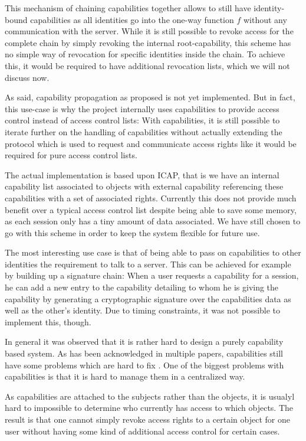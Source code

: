 This mechanism of chaining capabilities together allows to still have identity-bound capabilities as all identities go into the one-way function $f$ without any communication with the server.
While it is still possible to revoke access for the complete chain by simply revoking the internal root-capability, this scheme has no simple way of revocation for specific identities inside the chain.
To achieve this, it would be required to have additional revocation lists, which we will not discuss now.

As said, capability propagation as proposed is not yet implemented.
But in fact, this use-case is why the project internally uses capabilities to provide access control instead of access control lists:
With capabilities, it is still possible to iterate further on the handling of capabilities without actually extending the protocol which is used to request and communicate access rights like it would be required for pure access control lists.

\bigskip

The actual implementation is based upon ICAP, that is we have an internal capability list associated to objects with external capability referencing these capabilities with a set of associated rights.
Currently this does not provide much benefit over a typical access control list despite being able to save some memory, as each session only has a tiny amount of data associated.
We have still chosen to go with this scheme in order to keep the system flexible for future use.

The most interesting use case is that of being able to pass on capabilities to other identities the requirement to talk to a server.
This can be achieved for example by building up a signature chain:
When a user requests a capability for a session, he can add a new entry to the capability detailing to whom he is giving the capability by generating a cryptographic signature over the capabilities data as well as the other's identity.
Due to timing constraints, it was not possible to implement this, though.

\bigskip

In general it was observed that it is rather hard to design a purely capability based system.
As has been acknowledged in multiple papers, capabilities still have some problems which are hard to fix \cite{gong1989secure,shapiro1999eros}.
One of the biggest problems with capabilities is that it is hard to manage them in a centralized way.

As capabilities are attached to the subjects rather than the objects, it is usualyl hard to impossible to determine who currently has access to which objects.
The result is that one cannot simply revoke access rights to a certain object for one user without having some kind of additional access control for certain cases.

